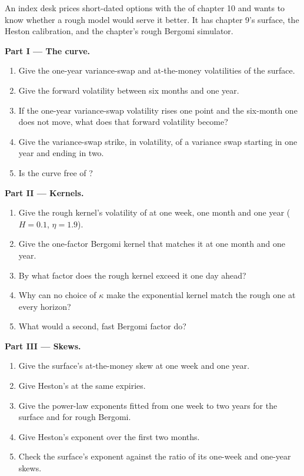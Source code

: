 \begin{problem}\label{pb:dv:rough-volatility-and-forward-variance-models:1}
An index desk prices short-dated options with the  of chapter 10 and wants to know whether a rough
model would serve it better. It has chapter 9's surface, the Heston calibration, and the chapter's rough Bergomi
simulator.

\medskip\noindent\textbf{Part I --- The curve.}
\begin{enumerate}
\item Give the one-year variance-swap and at-the-money volatilities of the surface.
\item Give the forward volatility between six months and one year.
\item If the one-year variance-swap volatility rises one point and the six-month one does not move, what does
that forward volatility become?
\item Give the variance-swap strike, in volatility, of a variance swap starting in one year and ending in two.
\item Is the curve free of ?
\end{enumerate}

\medskip\noindent\textbf{Part II --- Kernels.}
\begin{enumerate}[resume]
\item Give the rough kernel's volatility of  at one week, one month and one year ($H=0.1$,
$\eta=1.9$).
\item Give the one-factor Bergomi kernel that matches it at one month and one year.
\item By what factor does the rough kernel exceed it one day ahead?
\item Why can no choice of $\kappa$ make the exponential kernel match the rough one at every horizon?
\item What would a second, fast Bergomi factor do?
\end{enumerate}

\medskip\noindent\textbf{Part III --- Skews.}
\begin{enumerate}[resume]
\item Give the surface's at-the-money skew at one week and one year.
\item Give Heston's at the same expiries.
\item Give the power-law exponents fitted from one week to two years for the surface and for rough Bergomi.
\item Give Heston's exponent over the first two months.
\item Check the surface's exponent against the ratio of its one-week and one-year skews.
\end{enumerate}


\end{problem}
